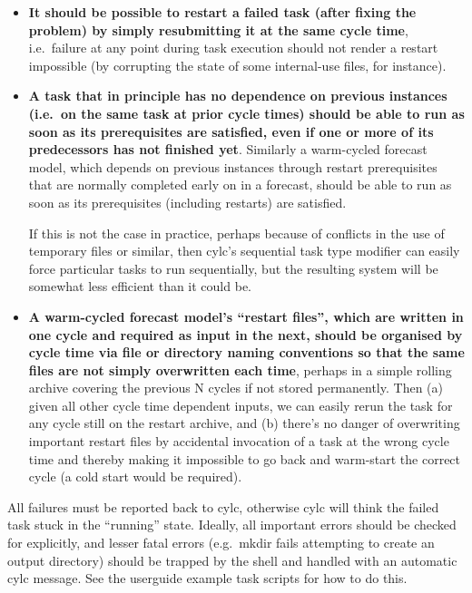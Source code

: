 \documentclass[11pt,a4paper]{article}
\begin{document}
\begin{itemize}
    \item  {\bf It should be possible to restart a failed task (after fixing
        the problem) by simply resubmitting it at the same cycle time}, i.e.\
        failure at any point during task execution should not render a
        restart impossible (by corrupting the state of some internal-use
        files, for instance). 

    \item {\bf A task that in principle has no dependence on previous
        instances (i.e.\ on the same task at prior cycle times) should
        be able to run as soon as its prerequisites are satisfied, even
        if one or more of its predecessors has not finished yet}.
        Similarly a warm-cycled forecast model, which depends on
        previous instances
        through restart prerequisites that are normally completed
        early on in a forecast, should be able to run as soon as its
        prerequisites (including restarts) are satisfied.

        If this is not the case in practice, perhaps because of
        conflicts in the use of temporary files or similar, then cylc's
        sequential task type modifier can easily force particular tasks
        to run sequentially, but the resulting system will be somewhat
        less efficient than it could be.

    \item {\bf A warm-cycled forecast model's ``restart files'', which
        are written in one cycle and required as input in the next,
        should be organised by cycle time via file or directory naming
        conventions so that the same files are not simply overwritten
        each time}, perhaps in a simple rolling archive covering the
        previous N cycles if not stored permanently. Then (a) given all
        other cycle time dependent inputs, we can easily rerun the task
        for any cycle still on the restart archive, and (b) there's no
        danger of overwriting important restart files by accidental
        invocation of a task at the wrong cycle time and thereby
        making it impossible to go back and warm-start the correct cycle
        (a cold start would be required).

\end{itemize}

All failures must be reported back to cylc, otherwise cylc will think
the failed task stuck in the ``running'' state.  Ideally, all important
errors should be checked for explicitly, and lesser fatal errors (e.g.\
mkdir fails attempting to create an output directory) should be trapped 
by the shell and handled with an automatic cylc message. See the
userguide example task scripts for how to do this.
\end{document}
